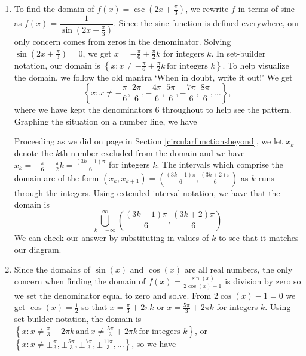 {
\begin{enumerate}

\item  To find the domain of $f(x) = \csc\left(2x + \frac{\pi}{3}\right)$, we rewrite $f$ in terms of sine as $f(x) = \dfrac{1}{\sin\left(2x + \frac{\pi}{3}\right)}$.  Since the sine function is defined everywhere, our only concern comes from zeros in the denominator.  Solving $\sin\left(2x + \frac{\pi}{3}\right) = 0$, we get $x = -\frac{\pi}{6} + \frac{\pi}{2} k$ for integers $k$.  In set-builder notation, our domain is  $\left\{ x : x \neq  -\frac{\pi}{6} + \frac{\pi}{2} k \, \text{for integers $k$} \right\}$.  To help visualize the domain,  we follow the old mantra `When in doubt, write it out!' We get 
\[
\left\{ x : x \neq  -\frac{\pi}{6}, \frac{2\pi}{6}, -\frac{4\pi}{6}, \frac{5\pi}{6}, -\frac{7\pi}{6}, \frac{8\pi}{6}, \ldots \right\},
\]
where we have kept the denominators $6$ throughout to help see the pattern.  Graphing the situation on a number line, we have

\begin{center}
\end{center}

Proceeding as we did on page \pageref{extendedinterval} in Section \ref{circularfunctionsbeyond}, we let $x_{k}$ denote the $k$th number excluded from the domain and we have  $x_{k} = -\frac{\pi}{6} + \frac{\pi}{2} k = \frac{(3k-1)\pi}{6}$ for integers $k$.  The intervals which comprise the domain are of the form $\left(x_{k}, x_{k+1}  \right) = \left(\frac{(3k-1)\pi}{6}, \frac{(3k+2)\pi}{6} \right)$ as $k$ runs through the integers.  Using extended interval notation, we have that the domain is
\[
 \bigcup_{k = -\infty}^{\infty}  \left(\dfrac{(3k-1)\pi}{6}, \dfrac{(3k+2)\pi}{6} \right)
\]
We can check our answer by substituting in values of $k$ to see that it matches our diagram.


\item  Since the domains of $\sin(x)$ and $\cos(x)$ are all real numbers, the only concern when finding the domain of  $f(x) =  \frac{\sin(x)}{2\cos(x) - 1}$ is division by zero so we set the denominator equal to zero and solve. From $2\cos(x) - 1 = 0$ we get $\cos(x) = \frac{1}{2}$ so that $x = \frac{\pi}{3} + 2\pi k$ or $x = \frac{5\pi}{3} + 2\pi k$ for integers $k$.  Using set-builder notation, the domain is $\left\{ x : x \neq \frac{\pi}{3} + 2\pi k \, \text{and} \, x \neq \frac{5\pi}{3} + 2\pi k \, \text{for integers $k$} \right\}$, or  $\left\{ x : x \neq \pm \frac{\pi}{3}, \pm \frac{5\pi}{3}, \pm \frac{7\pi}{3}, \pm \frac{11\pi}{3}, \ldots \right\}$, so we have


\end{enumerate}}
